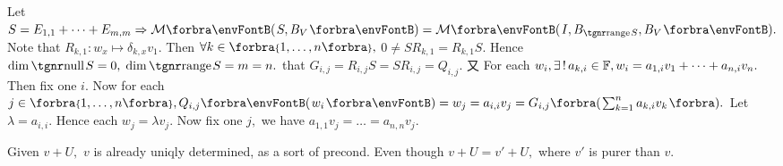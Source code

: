 {\vspace{2pt}Let {$S=E_{1,1}+\dots+E_{m,m}\Rightarrow \Mt{S,B_V}=\Mt{I,B_{\range S},B_V}.$} Note that $R_{k,1}:w_x\mapsto\delta_{k,x}v_1.$}\parSol{}
{\vspace{2pt}Then $\forall k\in\Bra{1,\dots,n},$ {\FontLarge$0\neq SR_{k,1}=R_{k,1}S.$} Hence $\dim\null S=0,\;\dim\range S=m=n.$}\parSol{}
\vspace{2pt}\NOTICE that {\FontLarge$G_{i,j}=R_{i,j}S=SR_{i,j}=Q_{i,j}$}. 又 For each $w_i,\exists\,!\,a_{k,i}\in{\mathbb{F}},w_i=a_{1,i}v_1+\dots+a_{n,i}v_n.$\parSol{}
Then fix one $i.$ Now for each $j\in\Bra{1,\dots,n},Q_{i,j}\Par{w_i}=w_j=a_{i,i}v_j=G_{i,j}\BigBigPar{{\sum_{k=1}^na_{k,i} v_k}}.$\parSol{}
Let $\lambda=a_{i,i}.$ Hence each $w_j=\lambda v_j.$ Now fix one $j,$ we have $a_{1,1}v_j=\dots=a_{n,n}v_j.$\PfEnd
\SepLine
\ChEnd
\pagebreak


\vspace{4pt}

\BulletPointX{}\;\;Given $v+U,$ $v$ is already uniqly determined, as a sort of precond.\TextB{}
Even though $v+U=v'+U,$ where $v'$ is {\tgsl purer} than $v.$
\SepLine

\BulletPointX\NoteForSmall{[3.85]}\;\;
\SepLine

